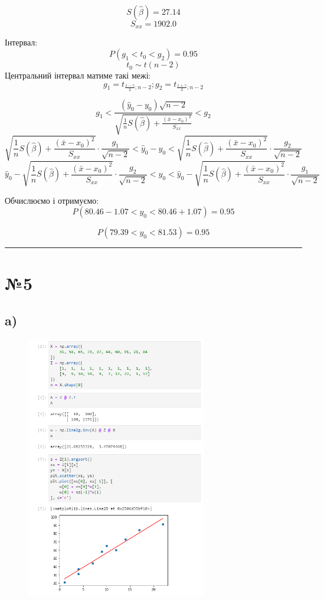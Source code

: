 \documentclass[11pt, a4paper]{article} %
\begin{document}
$$S(\hat \beta) = 27.14$$
$$S_{xx} = 1902.0$$

Інтервал:
$$P(g_1 < t_0 < g_2) = 0.95$$
$$t_0 \sim t(n-2)$$
Центральний інтервал матиме такі межі: $$g_1 = t_{\frac{1-\gamma}{2};n-2}; g_2 = t_{\frac{1+\gamma}{2};n-2}$$

$$g_1 < \frac{(\hat y_0 - y_0) \sqrt{n-2}}{\sqrt{\frac{1}{n}S(\hat \beta) + \frac{(\bar x - x_0)^2}{S_{xx}}}} < g_2$$
$$\sqrt{\frac{1}{n}S(\hat \beta) + \frac{(\bar x - x_0)^2}{S_{xx}}} \cdot \frac{g_1}{\sqrt{n-2}} < \hat y_0 - y_0 < \sqrt{\frac{1}{n}S(\hat \beta) + \frac{(\bar x - x_0)^2}{S_{xx}}} \cdot \frac{g_2}{\sqrt{n-2}}$$
$$\hat y_0 - \sqrt{\frac{1}{n}S(\hat \beta) + \frac{(\bar x - x_0)^2}{S_{xx}}} \cdot \frac{g_2}{\sqrt{n-2}} < y_0 < \hat y_0 - \sqrt{\frac{1}{n}S(\hat \beta) + \frac{(\bar x - x_0)^2}{S_{xx}}} \cdot \frac{g_1}{\sqrt{n-2}}$$

Обчислюємо і отримуємо:
$$P(80.46 - 1.07 < y_0 < 80.46 + 1.07) = 0.95$$
\begin{mdframed}[style=ans]
    $$P(79.39 < y_0 < 81.53) = 0.95$$
\end{mdframed}

\noindent\rule{\textwidth}{0.4pt}

\section*{№5}
\subsection*{a)}

\begin{figure}[h]
    \centering
    \includegraphics[width=0.7\textwidth]{task5.1.png}
\end{figure}
\pagebreak
\end{document}

